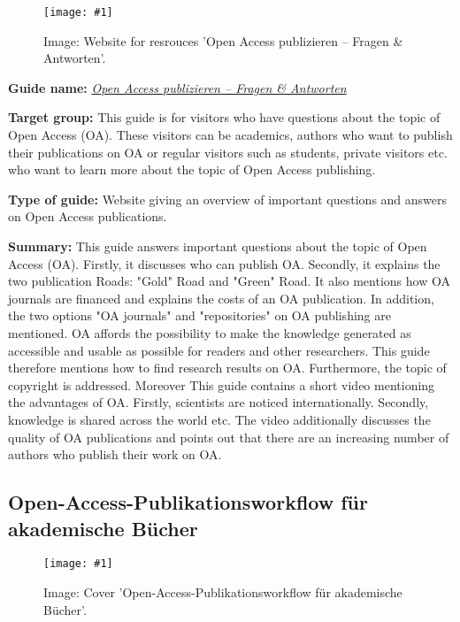 \documentclass{article}
\newlength{\imgwidth}
\newcommand\scaledgraphics[2]{%
                
\settowidth{\imgwidth}{\texttt{[image: \#1]}}%
                
\setlength{\imgwidth}{\minof{\imgwidth}{#2\textwidth}}%
                
\texttt{[image: \#1]}%
                
}
\begin{document}
\begin{figure}
\scaledgraphics{f61a96b6-6ada-4caf-b8f3-1ef6ac943b93.png}{1}
\caption*{Image: Website for resrouces 'Open Access publizieren – Fragen \& Antworten'.}\label{F90452781}
\end{figure}


\textbf{Guide name:} \emph{\href{https://www.bildung-forschung.digital/de/open-access-publizieren---fragen-antworten-2678.html}{Open Access publizieren – Fragen \& Antworten}} 

\autocite{bundesministerium_fur_bildung_und_forschung_open_2021}


\textbf{Target group: }This guide is for visitors who have questions about the topic of Open Access (OA). These visitors can be academics, authors who want to publish their publications on OA or regular visitors such as students, private visitors etc. who want to learn more about the topic of Open Access publishing.


\textbf{Type of guide: }Website giving an\textbf{ }overview of important questions and answers on Open Access publications.


\textbf{Summary: }This guide answers important questions about the topic of Open Access (OA). Firstly, it discusses who can publish OA. Secondly, it explains the two publication Roads: "Gold" Road and "Green" Road. It also mentions how OA journals are financed and explains the costs of an OA publication. In addition, the two options "OA journals" and "repositories" on OA publishing are mentioned. OA affords the possibility to make the knowledge generated as accessible and usable as possible for readers and other researchers. This guide therefore mentions how to find research results on OA. Furthermore, the topic of copyright is addressed. Moreover This guide contains a short video mentioning the advantages of OA. Firstly, scientists are noticed internationally. Secondly, knowledge is shared across the world etc. The video additionally discusses the quality of OA publications and points out that there are an increasing number of authors who publish their work on OA.


\subsection{Open-Access-Publikationsworkflow für akademische Bücher}\label{H6691479}



\begin{center}
\begin{figure}
\scaledgraphics{39363ae5-01d9-4e5a-a46f-bf20971df65a.jpg}{0.5}
\caption*{Image: Cover 'Open-Access-Publikationsworkflow für akademische Bücher'.}\label{F7674061}
\end{figure}


\end{center}
\end{document}
